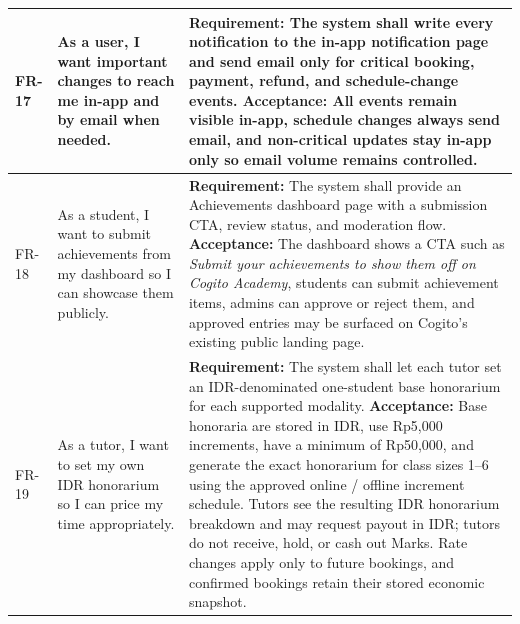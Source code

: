 \documentclass[11pt,a4paper]{article}
\begin{document}
\begin{longtable}{|L{1.5cm}|L{4.1cm}|L{9.0cm}|}
	\hline
	FR-17           & As a user, I want important changes to reach me in-app and by email when needed.                                       & \textbf{Requirement:} The system shall write every notification to the in-app notification page and send email only for critical booking, payment, refund, and schedule-change events. \newline \textbf{Acceptance:} All events remain visible in-app, schedule changes always send email, and non-critical updates stay in-app only so email volume remains controlled.                                                                                                                                                                                                                                         \\
	\hline
	FR-18           & As a student, I want to submit achievements from my dashboard so I can showcase them publicly.                         & \textbf{Requirement:} The system shall provide an Achievements dashboard page with a submission CTA, review status, and moderation flow. \newline \textbf{Acceptance:} The dashboard shows a CTA such as \textit{Submit your achievements to show them off on Cogito Academy}, students can submit achievement items, admins can approve or reject them, and approved entries may be surfaced on Cogito's existing public landing page.                                                                                                                                                                                        \\
	\hline
	FR-19           & As a tutor, I want to set my own IDR honorarium so I can price my time appropriately.                         & \textbf{Requirement:} The system shall let each tutor set an IDR-denominated one-student base honorarium for each supported modality. \newline \textbf{Acceptance:} Base honoraria are stored in IDR, use Rp5,000 increments, have a minimum of Rp50,000, and generate the exact honorarium for class sizes 1--6 using the approved online / offline increment schedule. Tutors see the resulting IDR honorarium breakdown and may request payout in IDR; tutors do not receive, hold, or cash out Marks. Rate changes apply only to future bookings, and confirmed bookings retain their stored economic snapshot.                                                                                                                                                                                        \\

\end{longtable}
\end{document}
